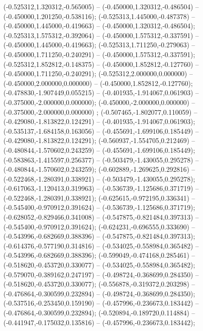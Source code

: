  (-0.525312,1.320312,-0.565005) -- (-0.450000,1.320312,-0.486504) -- (-0.450000,1.201250,-0.538116);
 (-0.525313,1.445000,-0.487378) -- (-0.450000,1.445000,-0.419663) -- (-0.450000,1.320312,-0.486504);
 (-0.525313,1.575312,-0.392064) -- (-0.450000,1.575312,-0.337591) -- (-0.450000,1.445000,-0.419663);
 (-0.525313,1.711250,-0.279063) -- (-0.450000,1.711250,-0.240291) -- (-0.450000,1.575312,-0.337591);
 (-0.525312,1.852812,-0.148375) -- (-0.450000,1.852812,-0.127760) -- (-0.450000,1.711250,-0.240291);
 (-0.525312,2.000000,0.000000) -- (-0.450000,2.000000,0.000000) -- (-0.450000,1.852812,-0.127760);
 (-0.478830,-1.907449,0.055215) -- (-0.401935,-1.914067,0.061903) -- (-0.375000,-2.000000,0.000000);
 (-0.450000,-2.000000,0.000000) -- (-0.375000,-2.000000,0.000000) ;
 (-0.507465,-1.802077,0.110059) -- (-0.429080,-1.813822,0.124291) -- (-0.401935,-1.914067,0.061903);
 (-0.535137,-1.684158,0.163056) -- (-0.455691,-1.699106,0.185449) -- (-0.429080,-1.813822,0.124291);
 (-0.560937,-1.554705,0.212469) -- (-0.480844,-1.570602,0.243259) -- (-0.455691,-1.699106,0.185449);
 (-0.583863,-1.415597,0.256377) -- (-0.503479,-1.430055,0.295278) -- (-0.480844,-1.570602,0.243259);
 (-0.602889,-1.269625,0.292816) -- (-0.522468,-1.280391,0.338921) -- (-0.503479,-1.430055,0.295278);
 (-0.617063,-1.120413,0.319963) -- (-0.536739,-1.125686,0.371719) -- (-0.522468,-1.280391,0.338921);
 (-0.625615,-0.972195,0.336341) -- (-0.545400,-0.970912,0.391624) -- (-0.536739,-1.125686,0.371719);
 (-0.628052,-0.829466,0.341008) -- (-0.547875,-0.821484,0.397313) -- (-0.545400,-0.970912,0.391624);
 (-0.624231,-0.696555,0.333690) -- (-0.543996,-0.682669,0.388396) -- (-0.547875,-0.821484,0.397313);
 (-0.614376,-0.577190,0.314816) -- (-0.534025,-0.558984,0.365482) -- (-0.543996,-0.682669,0.388396);
 (-0.599049,-0.474168,0.285461) -- (-0.518620,-0.453720,0.330077) -- (-0.534025,-0.558984,0.365482);
 (-0.579070,-0.389162,0.247197) -- (-0.498724,-0.368699,0.284350) -- (-0.518620,-0.453720,0.330077);
 (-0.556878,-0.319372,0.203298) -- (-0.476864,-0.300599,0.232894) -- (-0.498724,-0.368699,0.284350);
 (-0.537516,-0.253450,0.159190) -- (-0.457996,-0.236673,0.183442) -- (-0.476864,-0.300599,0.232894);
 (-0.520894,-0.189720,0.114884) -- (-0.441947,-0.175032,0.135816) -- (-0.457996,-0.236673,0.183442);
